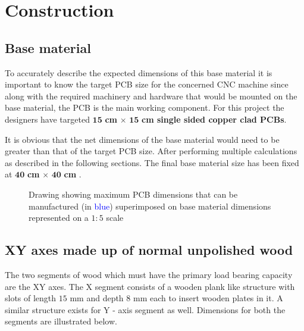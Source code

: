 \chapter{Construction} \label{chapter3}

\section{Base material} \label{bmaterial}

To accurately describe the expected dimensions of this base material it is important to know the target PCB size for the concerned CNC machine since along with the required machinery and hardware that would be mounted on the base material, the PCB is the main working component. For this project the designers have targeted $\boldsymbol{15}$ \textbf{cm} $\boldsymbol{\times}$ $\boldsymbol{15}$ \textbf{cm single sided copper clad PCBs}. \par

It is obvious that the net dimensions of the base material would need to be greater than that of the target PCB size. After performing multiple calculations as described in the following sections. The final base material size has been fixed at $\boldsymbol{40}$ \textbf{cm} $\boldsymbol{\times}$ $\boldsymbol{40}$ \textbf{cm} .

\begin{figure}[h]
 \centering
 \caption{Drawing showing maximum PCB dimensions that can be manufactured (in \textcolor{blue}{blue}) superimposed on base material dimensions represented on a $1:5$ scale}
 \label{fig:base}
\end{figure}


\section{XY axes made up of normal unpolished wood}

The two segments of wood which must have the primary load bearing capacity are the XY axes. The X segment consists of a wooden plank like structure with slots of length $15$ mm and depth $8$ mm each to insert wooden plates in it. A similar structure exists for Y - axis segment as well. Dimensions for both the segments are illustrated below. \par


